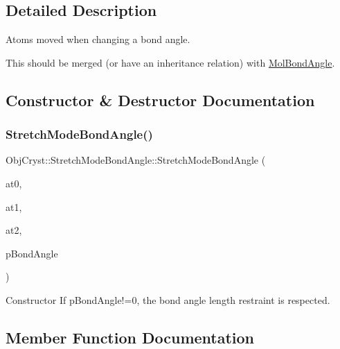 \subsection{Detailed Description}
Atoms moved when changing a bond angle.

This should be merged (or have an inheritance relation) with \mbox{\hyperlink{class_obj_cryst_1_1_mol_bond_angle}{Mol\+Bond\+Angle}}. 

\subsection{Constructor \& Destructor Documentation}
\mbox{\label{struct_obj_cryst_1_1_stretch_mode_bond_angle_aa1fbf3238722b663b083c999cf1b5c57}} 
\subsubsection{\texorpdfstring{StretchModeBondAngle()}{StretchModeBondAngle()}}
{\footnotesize\ttfamily Obj\+Cryst\+::\+Stretch\+Mode\+Bond\+Angle\+::\+Stretch\+Mode\+Bond\+Angle (\begin{DoxyParamCaption}\item[{\mbox{\hyperlink{class_obj_cryst_1_1_mol_atom}{Mol\+Atom}} \&}]{at0,  }\item[{\mbox{\hyperlink{class_obj_cryst_1_1_mol_atom}{Mol\+Atom}} \&}]{at1,  }\item[{\mbox{\hyperlink{class_obj_cryst_1_1_mol_atom}{Mol\+Atom}} \&}]{at2,  }\item[{const \mbox{\hyperlink{class_obj_cryst_1_1_mol_bond_angle}{Mol\+Bond\+Angle}} $\ast$}]{p\+Bond\+Angle }\end{DoxyParamCaption})}

Constructor If p\+Bond\+Angle!=0, the bond angle length restraint is respected. 

\subsection{Member Function Documentation}
\mbox{\label{struct_obj_cryst_1_1_stretch_mode_bond_angle_a72c7ded6a3919b589dabbbd46c43671b}} 
